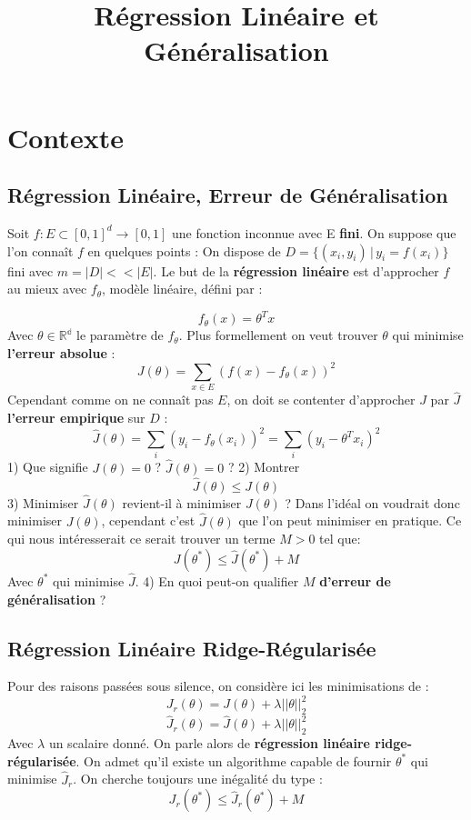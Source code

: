 \documentclass[12pt]{article}
\title{Régression Linéaire et Généralisation}
\begin{document}
\maketitle


\section{Contexte}
\subsection{Régression Linéaire, Erreur de Généralisation}
Soit $f: E \subset [0,1]^d \to [0,1]$ une fonction inconnue avec E \textbf{fini}.   
On suppose que l'on connaît $f$ en quelques points :     
On dispose de $D = \{(x_i,y_i) \, | \, y_i = f(x_i)\}$ fini avec $m = |D| << |E|$.   
Le but de la \textbf{régression linéaire} est d'approcher $f$ au mieux avec $f_\theta$, modèle linéaire, défini par :   

$$ f_\theta(x) = \theta^{T}x$$
Avec $\theta \in \mathbb{R^d}$ le paramètre de $f_\theta$.    
Plus formellement on veut trouver $\theta$ qui minimise \textbf{l'erreur absolue} :   
$$ J(\theta) = \sum_{x \in E} (f(x)-f_\theta(x))^2 $$    
Cependant comme on ne connaît pas $E$, on doit se contenter d'approcher $J$ par $\hat J$ \textbf{l'erreur empirique} sur $D$ :
$$ \hat{J}(\theta) =  \sum_{i} (y_i-f_\theta(x_i))^2 = \sum_{i} (y_i-\theta^{T}x_i)^2 $$ 
1) Que signifie $J(\theta) = 0$ ? $\hat{J}(\theta) = 0$ ?   
2) Montrer $$ \hat{J}(\theta) \leq J(\theta)$$     
3) Minimiser $\hat{J}(\theta)$ revient-il à minimiser $J(\theta)$ ?   
Dans l'idéal on voudrait donc minimiser $J(\theta)$, cependant c'est $\hat{J}(\theta)$ que l'on peut minimiser en pratique.   
Ce qui nous intéresserait ce serait trouver un terme $M > 0$ tel que:    
$$ J(\theta^*) \leq \hat{J}(\theta^*) + M$$   
Avec $\theta^*$ qui minimise $\hat{J}$.    
4) En quoi peut-on qualifier $M$ \textbf{d'erreur de généralisation} ?
\subsection{Régression Linéaire Ridge-Régularisée}
Pour des raisons passées sous silence, on considère ici les minimisations de : 
$$ J_r(\theta) = J(\theta) + \lambda ||\theta||_2^2 $$
$$\hat{J}_r(\theta) = \hat{J}(\theta) + \lambda ||\theta||_2^2$$   
Avec $\lambda$ un scalaire donné.   
On parle alors de \textbf{régression linéaire ridge-régularisée}.  
On admet qu'il existe un algorithme capable de fournir $\theta^{*}$ qui minimise $\hat{J}_r $.   
On cherche toujours une inégalité du type :   
$$ J_r(\theta^{*}) \leq \hat{J}_r(\theta^{*}) + M$$   
\end{document}
